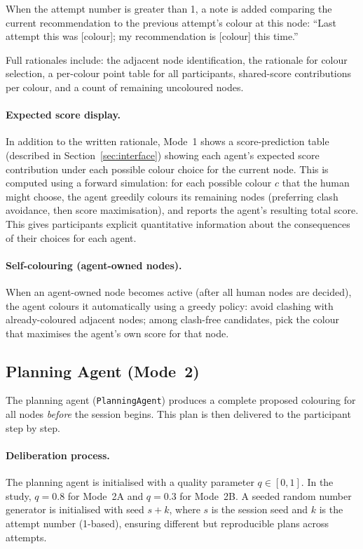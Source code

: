 \documentclass[11pt]{article}
\theoremstyle{definition}
\begin{document}
When the attempt number is greater than 1, a note is added comparing the current
recommendation to the previous attempt's colour at this node: ``Last attempt this was
[colour]; my recommendation is [colour] this time.''

Full rationales include: the adjacent node identification, the rationale for colour
selection, a per-colour point table for all participants, shared-score contributions per
colour, and a count of remaining uncoloured nodes.

\paragraph{Expected score display.}
In addition to the written rationale, Mode~1 shows a score-prediction table (described
in Section~\ref{sec:interface}) showing each agent's expected score contribution under
each possible colour choice for the current node.  This is computed using a forward
simulation: for each possible colour $c$ that the human might choose, the agent
greedily colours its remaining nodes (preferring clash avoidance, then score
maximisation), and reports the agent's resulting total score.  This gives participants
explicit quantitative information about the consequences of their choices for each
agent.

\paragraph{Self-colouring (agent-owned nodes).}
When an agent-owned node becomes active (after all human nodes are decided), the agent
colours it automatically using a greedy policy: avoid clashing with already-coloured
adjacent nodes; among clash-free candidates, pick the colour that maximises the agent's
own score for that node.

\subsection{Planning Agent (Mode~2)}
\label{sec:planning_agent}

The planning agent (\texttt{PlanningAgent}) produces a complete proposed colouring
for all nodes \emph{before} the session begins.  This plan is then delivered to the
participant step by step.

\paragraph{Deliberation process.}
The planning agent is initialised with a quality parameter $q \in [0, 1]$.  In the
study, $q = 0.8$ for Mode~2A and $q = 0.3$ for Mode~2B.  A seeded random number
generator is initialised with seed $s + k$, where $s$ is the session seed and $k$ is
the attempt number (1-based), ensuring different but reproducible plans across attempts.
\end{document}

